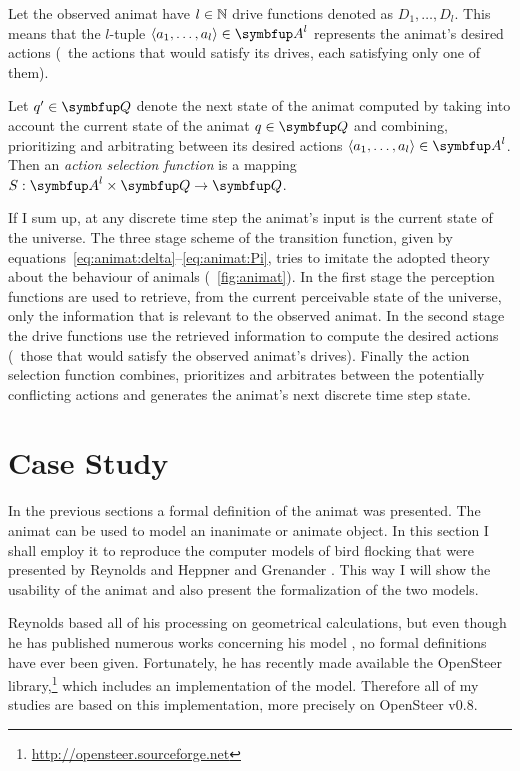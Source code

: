 Let the observed animat have $l \in \mathbb{N}$ drive functions denoted as $D_1,\ldots,D_l$. This means that the $l$-tuple $\langle a_1,\ldots,a_l\rangle \in \set{A}^l$ represents the animat's desired actions (\ie\ the actions that would satisfy its drives, each satisfying only one of them).

\begin{definition}
  \label{def:animat:S}
  Let $q' \in \set{Q}$ denote the next state of the animat computed by taking into account the current state of the animat $q \in \set{Q}$ and combining, prioritizing and arbitrating between its desired actions $\langle a_1,\ldots,a_l\rangle \in \set{A}^l$. Then an \emph{action selection function} is a mapping $S: \set{A}^l \times \set{Q} \rightarrow \set{Q}$.
\end{definition}

If I sum up, at any discrete time step the animat's input is the current state of the universe. The three stage scheme of the transition function, given by equations~\eqref{eq:animat:delta}--\eqref{eq:animat:Pi}, tries to imitate the adopted theory about the behaviour of animals (\fig~\ref{fig:animat}). In the first stage the perception functions are used to retrieve, from the current perceivable state of the universe, only the information that is relevant to the observed animat. In the second stage the drive functions use the retrieved information to compute the desired actions (\ie\ those that would satisfy the observed animat's drives). Finally the action selection function combines, prioritizes and arbitrates between the potentially conflicting actions and generates the animat's next discrete time step state.

\section{Case Study}
In the previous sections a formal definition of the animat was  presented. The animat can be used to model an inanimate or animate object. In this section I shall employ it to reproduce the computer models of bird flocking that were presented by Reynolds \cite{reynolds:1987} and Heppner and Grenander \cite{heppner:1990}. This way I will show the usability of the animat and also present the formalization of the two models.

Reynolds based all of his processing on geometrical calculations, but even though he has published numerous works concerning his model \cite{reynolds:1987,reynolds:1993a,reynolds:1993b,reynolds:1994,reynolds:1999,reynolds:2000}, no formal definitions have ever been given. Fortunately, he has recently made available the OpenSteer library,\footnote{\href{http://opensteer.sourceforge.net}{http://opensteer.sourceforge.net}} which includes an implementation of the model. Therefore all of my studies are based on this implementation, more precisely on OpenSteer v0.8.

